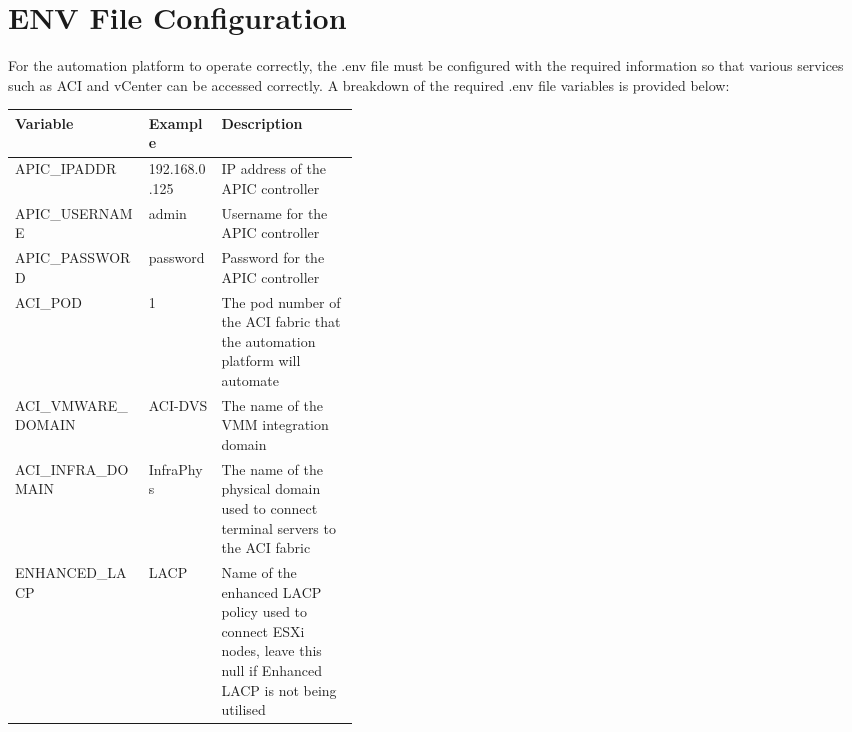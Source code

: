 \section*{ENV File Configuration}
For the automation platform to operate correctly, the .env file must be configured with the required information so that various services such as ACI and vCenter can be accessed correctly. A breakdown of the required .env file variables is provided below:
\begin{table}[H]
    \centering
    \begin{tabular}{l l p{0.4\linewidth}}
        \textbf{Variable}         & \textbf{Example} & \textbf{Description}                                                                                                \\
        \hline
        APIC\_IPADDR              & 192.168.0.125    & IP address of the APIC controller                                                                                   \\             \hline
        APIC\_USERNAME            & admin            & Username for the APIC controller                                                                                    \\            \hline
        
        APIC\_PASSWORD            & password         & Password for the APIC controller                                                                                    \\            \hline
        
        ACI\_POD                  & 1                & The pod number of the ACI fabric that the automation platform will automate                                         \\            \hline
        
        ACI\_VMWARE\_DOMAIN       & ACI-DVS          & The name of the VMM integration domain                                                                              \\            \hline
        
        ACI\_INFRA\_DOMAIN        & InfraPhys        & The name of the physical domain used to connect terminal servers to the ACI fabric                                  \\            \hline
        
        ENHANCED\_LACP            & LACP             & Name of the enhanced LACP policy used to connect ESXi nodes, leave this null if Enhanced LACP is not being utilised \\            \hline
        

\end{tabular}
\end{table}
